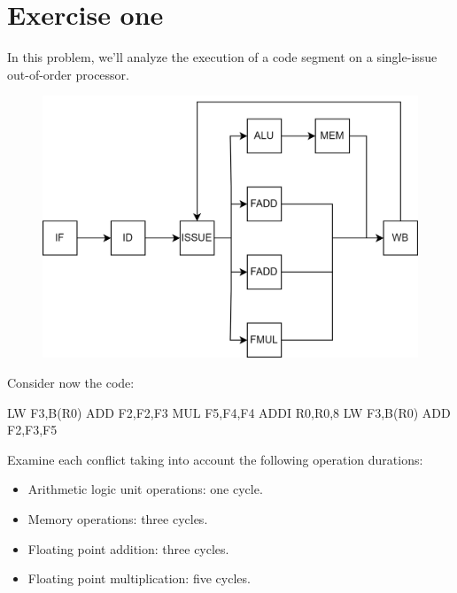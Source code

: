 \section{Exercise one}

In this problem, we'll analyze the execution of a code segment on a single-issue out-of-order processor.
\begin{figure}[H]
    \centering
    \includegraphics[width=0.75\linewidth]{images/complex.png}
\end{figure} 
Consider now the code:
\begin{verbnobox}[\verbarg]
LW F3,B(R0)
ADD F2,F2,F3
MUL F5,F4,F4
ADDI R0,R0,8
LW F3,B(R0)
ADD F2,F3,F5
\end{verbnobox}
Examine each conflict taking into account the following operation durations:
\begin{itemize}
    \item Arithmetic logic unit operations: one cycle.
    \item Memory operations: three cycles.
    \item Floating point addition: three cycles.
    \item Floating point multiplication: five cycles.
\end{itemize}


